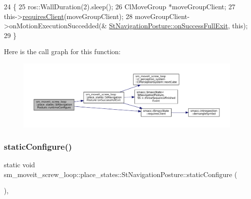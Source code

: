 \begin{DoxyCode}
24             \{
25                 ros::WallDuration(2).sleep();
26                 ClMoveGroup *moveGroupClient;
27                 this->\hyperlink{classsmacc_1_1ISmaccState_a7f95c9f0a6ea2d6f18d1aec0519de4ac}{requiresClient}(moveGroupClient);
28                 moveGroupClient->onMotionExecutionSuccedded(&
      \hyperlink{structsm__moveit__screw__loop_1_1place__states_1_1StNavigationPosture_a8d05eb1ba1269dae6030e73ba8240109}{StNavigationPosture::onSuccessFullExit}, \textcolor{keyword}{this});
29             \}
\end{DoxyCode}
Here is the call graph for this function\+:
\nopagebreak
\begin{figure}[H]
\begin{center}
\leavevmode
\includegraphics[width=350pt]{structsm__moveit__screw__loop_1_1place__states_1_1StNavigationPosture_aa882876ee000cef8122b39df0fdbe29b_cgraph}
\end{center}
\end{figure}
\mbox{\label{structsm__moveit__screw__loop_1_1place__states_1_1StNavigationPosture_a411e44be7bc5faac6fc320438588cdbb}} 
\subsubsection{\texorpdfstring{static\+Configure()}{staticConfigure()}}
{\footnotesize\ttfamily static void sm\+\_\+moveit\+\_\+screw\+\_\+loop\+::place\+\_\+states\+::\+St\+Navigation\+Posture\+::static\+Configure (\begin{DoxyParamCaption}{ }\end{DoxyParamCaption})\hspace{0.3cm}{\ttfamily [inline]}, {\ttfamily [static]}}



